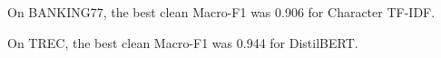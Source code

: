 On BANKING77, the best clean Macro-F1 was 0.906 for Character TF-IDF.

On TREC, the best clean Macro-F1 was 0.944 for DistilBERT.

